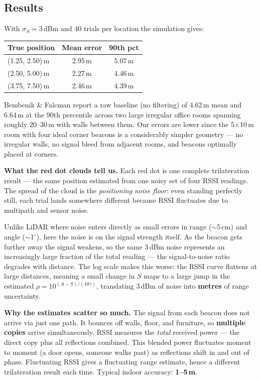 \documentclass[12pt, a4paper]{article}
\begin{document}
\subsection*{Results}

With $\sigma_S = 3$\,dBm and 40 trials per location the simulation gives:

\begin{center}
\renewcommand{\arraystretch}{1.4}
\begin{tabular}{lcc}
  \toprule
  \textbf{True position} & \textbf{Mean error} & \textbf{90th pct} \\
  \midrule
  (1.25, 2.50)\,m & 2.95\,m & 5.07\,m \\
  (2.50, 5.00)\,m & 2.27\,m & 4.46\,m \\
  (3.75, 7.50)\,m & 2.46\,m & 4.39\,m \\
  \bottomrule
\end{tabular}
\end{center}

Bembenik \& Falcman report a raw baseline (no filtering) of 4.62\,m
mean and 6.64\,m at the 90th percentile across two large irregular
office rooms spanning roughly 20--30\,m with walls between them.
Our errors are lower since the 5$\times$10\,m room with four ideal
corner beacons is a considerably simpler geometry --- no irregular
walls, no signal bleed from adjacent rooms, and beacons optimally
placed at corners.
\clearpage
\begin{notebox}
  \textbf{What the red dot clouds tell us.}
  Each red dot is one complete trilateration result --- the same
  position estimated from one noisy set of four RSSI readings.
  The spread of the cloud is the \emph{positioning noise floor}: even
  standing perfectly still, each trial lands somewhere different because
  RSSI fluctuates due to multipath and sensor noise.

  Unlike LiDAR where noise enters directly as small errors in range
  ($\sim$5\,cm) and angle ($\sim$1$^\circ$), here the noise is on the
  signal strength itself.
  As the beacon gets further away the signal weakens, so the same
  3\,dBm noise represents an increasingly large fraction of the total
  reading --- the signal-to-noise ratio degrades with distance.
  The log scale makes this worse: the RSSI curve flattens at large
  distances, meaning a small change in $S$ maps to a large jump in
  the estimated $\rho = 10^{(A-S)/(10\gamma)}$, translating 3\,dBm
  of noise into \textbf{metres} of range uncertainty.
\end{notebox}

\begin{warnbox}
  \textbf{Why the estimates scatter so much.}
  The signal from each beacon does not arrive via just one path.
  It bounces off walls, floor, and furniture, so \textbf{multiple
  copies} arrive simultaneously.
  RSSI measures the \emph{total} received power --- the direct copy
  plus all reflections combined.
  This blended power fluctuates moment to moment (a door opens,
  someone walks past) as reflections shift in and out of phase.
  Fluctuating RSSI gives a fluctuating range estimate, hence a
  different trilateration result each time.
  Typical indoor accuracy: \textbf{1--5\,m}.
\end{warnbox}
\end{document}
